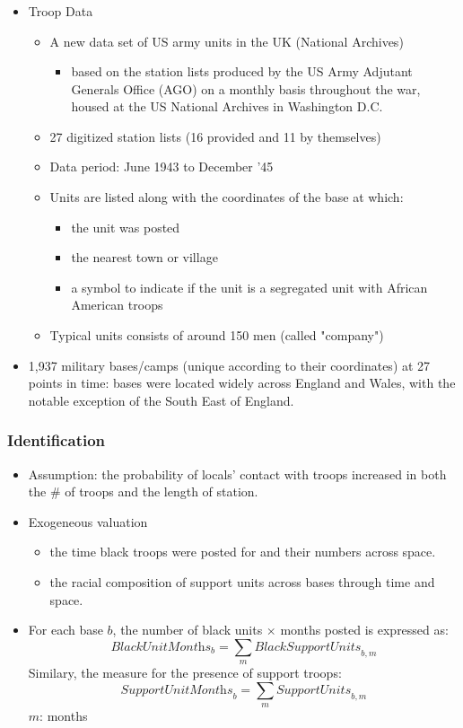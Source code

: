 \documentclass[dvipdfmx,11pt]{beamer}
\begin{document}
\begin{frame}\frametitle{}
  \begin{itemize}
    \item Troop Data
    \begin{itemize}
      \item A new data set of US army units in the UK (National Archives)
      \begin{itemize}
        \item based on the station lists produced by the US Army Adjutant Generals Office (AGO) on a monthly basis throughout the war, housed at the US National Archives in Washington D.C.
      \end{itemize}
      \item 27 digitized station lists (16 provided and 11 by themselves)
      \item Data period: June 1943 to December '45
      \item Units are listed along with the coordinates of the base at which:
      \begin{itemize}
        \item the unit was posted
        \item the nearest town or village
        \item a symbol to indicate if the unit is a segregated unit with African American troops
      \end{itemize}
      \item Typical units consists of around 150 men (called "company")
    \end{itemize}
    \item 1,937 military bases/camps (unique according to their coordinates) at 27 points in time: bases were located widely across England and Wales, with the notable exception of the South East of England.
  \end{itemize}
\end{frame}

\begin{frame}\frametitle{Identification}
  \begin{itemize}
    \item Assumption: the probability of locals' contact with troops increased in both the \# of troops and the length of station.
    \item Exogeneous valuation
    \begin{itemize}
      \item the time black troops were posted for and their numbers across space.
      \item the racial composition of support units across bases through time and space.
    \end{itemize}
    \item For each base $b$, the number of black units $\times$ months posted is expressed as:
    \[
    \textit{BlackUnitMonths}_b = \sum_m \textit{BlackSupportUnits}_{b, m}
    \]
    Similary, the measure for the presence of support troops:
    \[
    \textit{SupportUnitMonths}_b = \sum_m \textit{SupportUnits}_{b, m}
    \]
    $m$: months
  \end{itemize}
\end{frame}
\end{document}
